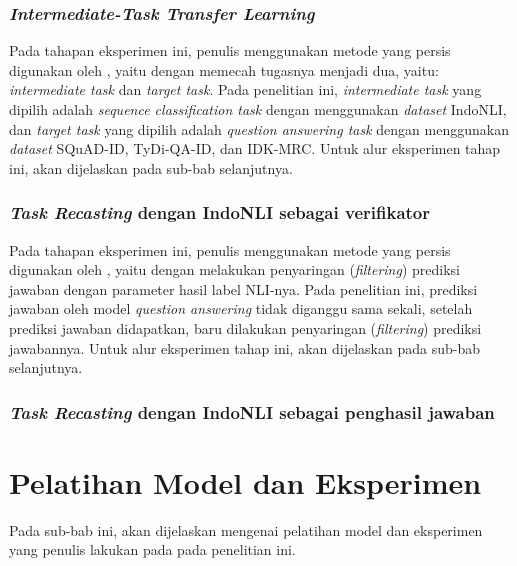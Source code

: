 \subsubsection{\emph{Intermediate-Task Transfer Learning}}
Pada tahapan eksperimen ini, penulis menggunakan metode yang persis digunakan oleh \citep{pruksachatkun-etal-2020-intermediate}, yaitu dengan memecah tugasnya menjadi dua, yaitu: \emph{intermediate task} dan \emph{target task}. Pada penelitian ini, \emph{intermediate task} yang dipilih adalah \emph{sequence classification task} dengan menggunakan \emph{dataset} IndoNLI, dan \emph{target task} yang dipilih adalah \emph{question answering task} dengan menggunakan \emph{dataset} SQuAD-ID, TyDi-QA-ID, dan IDK-MRC. Untuk alur eksperimen tahap ini, akan dijelaskan pada sub-bab selanjutnya.

\subsubsection{\emph{Task Recasting} dengan IndoNLI sebagai verifikator}
Pada tahapan eksperimen ini, penulis menggunakan metode yang persis digunakan oleh \citep{chen-etal-2021-nli-models}, yaitu dengan melakukan penyaringan (\emph{filtering}) prediksi jawaban dengan parameter hasil label NLI-nya. Pada penelitian ini, prediksi jawaban oleh model \emph{question answering} tidak diganggu sama sekali, setelah prediksi jawaban didapatkan, baru dilakukan penyaringan (\emph{filtering}) prediksi jawabannya. Untuk alur eksperimen tahap ini, akan dijelaskan pada sub-bab selanjutnya. 

\subsubsection{\emph{Task Recasting} dengan IndoNLI sebagai penghasil jawaban}
\todo

\section{Pelatihan Model dan Eksperimen}
Pada sub-bab ini, akan dijelaskan mengenai pelatihan model dan eksperimen yang penulis lakukan pada pada penelitian ini. 

